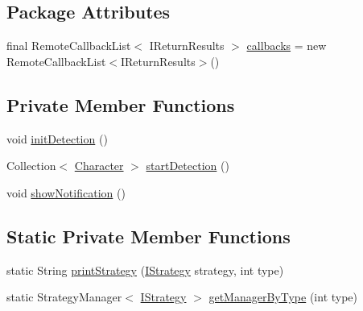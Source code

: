 \subsection*{Package Attributes}
\begin{DoxyCompactItemize}
\item 
final RemoteCallbackList$<$ IReturnResults $>$ \hyperlink{classch_1_1zhaw_1_1ba10__bsha__1_1_1service_1_1DetectionService_af1cfbca8177ea5c9c92d30b4f0f3052c}{callbacks} = new RemoteCallbackList$<$IReturnResults$>$()
\end{DoxyCompactItemize}
\subsection*{Private Member Functions}
\begin{DoxyCompactItemize}
\item 
void \hyperlink{classch_1_1zhaw_1_1ba10__bsha__1_1_1service_1_1DetectionService_a0b70bd7c8703ca40307ec7cfb79c4c87}{initDetection} ()
\item 
Collection$<$ \hyperlink{classch_1_1zhaw_1_1ba10__bsha__1_1_1Character}{Character} $>$ \hyperlink{classch_1_1zhaw_1_1ba10__bsha__1_1_1service_1_1DetectionService_a46d2b046ce0e9baa02ee1a064e7bd766}{startDetection} ()
\item 
void \hyperlink{classch_1_1zhaw_1_1ba10__bsha__1_1_1service_1_1DetectionService_a916374be5bffc9ece850bb0cc92d480f}{showNotification} ()
\end{DoxyCompactItemize}
\subsection*{Static Private Member Functions}
\begin{DoxyCompactItemize}
\item 
static String \hyperlink{classch_1_1zhaw_1_1ba10__bsha__1_1_1service_1_1DetectionService_a201836f7453d62a935b7eed1203b27f6}{printStrategy} (\hyperlink{interfacech_1_1zhaw_1_1ba10__bsha__1_1_1strategies_1_1IStrategy}{IStrategy} strategy, int type)
\item 
static StrategyManager$<$ \hyperlink{interfacech_1_1zhaw_1_1ba10__bsha__1_1_1strategies_1_1IStrategy}{IStrategy} $>$ \hyperlink{classch_1_1zhaw_1_1ba10__bsha__1_1_1service_1_1DetectionService_a6ad4b4b98cda7ec8ebfb0420f93e03dd}{getManagerByType} (int type)
\end{DoxyCompactItemize}
